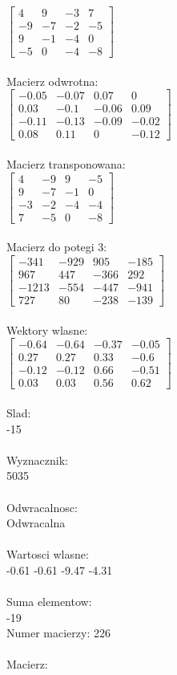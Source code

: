 \documentclass[a4paper,12pt]{article}
\begin{document}
$\begin{bmatrix} 4&9&-3&7\\-9&-7&-2&-5\\9&-1&-4&0\\-5&0&-4&-8 \end{bmatrix}$
\\
\\
Macierz odwrotna:\\

$\begin{bmatrix} -0.05&-0.07&0.07&0\\0.03&-0.1&-0.06&0.09\\-0.11&-0.13&-0.09&-0.02\\0.08&0.11&0&-0.12 \end{bmatrix}$
\\
\\
Macierz transponowana:\\

$\begin{bmatrix} 4&-9&9&-5\\9&-7&-1&0\\-3&-2&-4&-4\\7&-5&0&-8 \end{bmatrix}$
\\
\\
Macierz do potegi 3:\\

$\begin{bmatrix} -341&-929&905&-185\\967&447&-366&292\\-1213&-554&-447&-941\\727&80&-238&-139 \end{bmatrix}$
\\
\\
Wektory wlasne:\\

$\begin{bmatrix} -0.64&-0.64&-0.37&-0.05\\0.27&0.27&0.33&-0.6\\-0.12&-0.12&0.66&-0.51\\0.03&0.03&0.56&0.62 \end{bmatrix}$
\\
\\
Slad:\\
-15
\\
\\
Wyznacznik:\\
5035
\\
\\
Odwracalnosc:\\
Odwracalna
\\
\\
Wartosci wlasne:\\
-0.61 -0.61 -9.47 -4.31
\\
\\
Suma elementow:\\
-19
\\
\newpage
Numer macierzy:
226
\\
\\
Macierz:\\
\end{document}
